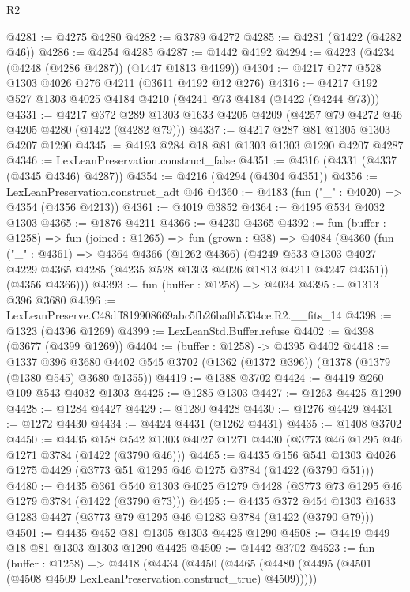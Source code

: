 \begin{lexlean}{R2}
\begin{coremodule}
@4281 := @4275 @4280
@4282 := @3789 @4272
@4285 := @4281 (@1422 (@4282 @46))
@4286 := @4254 @4285
@4287 := @1442 @4192
@4294 := @4223 (@4234 (@4248 (@4286 @4287)) (@1447 @1813 @4199))
@4304 := @4217 @277 @528 @1303 @4026 @276 @4211 (@3611 @4192 @12 @276)
@4316 := @4217 @192 @527 @1303 @4025 @4184 @4210 (@4241 @73 @4184 (@1422 (@4244 @73)))
@4331 := @4217
    @372
    @289
    @1303
    @1633
    @4205
    @4209
    (@4257 @79 @4272 @46 @4205 @4280 (@1422 (@4282 @79)))
@4337 := @4217 @287 @81 @1305 @1303 @4207 @1290
@4345 := @4193 @284 @18 @81 @1303 @1303 @1290 @4207 @4287
@4346 := LexLeanPreservation.construct_false
@4351 := @4316 (@4331 (@4337 (@4345 @4346) @4287))
@4354 := @4216 (@4294 (@4304 @4351))
@4356 := LexLeanPreservation.construct_adt @46
@4360 := @4183 (fun ("_" : @4020) => @4354 (@4356 @4213))
@4361 := @4019 @3852
@4364 := @4195 @534 @4032 @1303
@4365 := @1876 @4211
@4366 := @4230 @4365
@4392 := fun (buffer : @1258) =>
  fun (joined : @1265) =>
  fun (grown : @38) =>
  @4084
    (@4360
      (fun ("_" : @4361) =>
      @4364
        @4366
        (@1262 @4366)
        (@4249 @533 @1303 @4027 @4229 @4365 @4285 (@4235 @528 @1303 @4026 @1813 @4211 @4247 @4351))
        (@4356 @4366)))
@4393 := fun (buffer : @1258) => @4034
@4395 := @1313 @396 @3680
@4396 := LexLeanPreserve.C48dff819908669abc5fb26ba0b5334ce.R2.__fits_14
@4398 := @1323 (@4396 @1269)
@4399 := LexLeanStd.Buffer.refuse
@4402 := @4398 (@3677 (@4399 @1269))
@4404 := (buffer : @1258) -> @4395 @4402
@4418 := @1337
    @396
    @3680
    @4402
    @545
    @3702
    (@1362 (@1372 @396))
    (@1378 (@1379 (@1380 @545) @3680 @1355))
@4419 := @1388 @3702
@4424 := @4419 @260 @109 @543 @4032 @1303
@4425 := @1285 @1303
@4427 := @1263 @4425 @1290
@4428 := @1284 @4427
@4429 := @1280 @4428
@4430 := @1276 @4429
@4431 := @1272 @4430
@4434 := @4424 @4431 (@1262 @4431)
@4435 := @1408 @3702
@4450 := @4435
    @158
    @542
    @1303
    @4027
    @1271
    @4430
    (@3773 @46 @1295 @46 @1271 @3784 (@1422 (@3790 @46)))
@4465 := @4435
    @156
    @541
    @1303
    @4026
    @1275
    @4429
    (@3773 @51 @1295 @46 @1275 @3784 (@1422 (@3790 @51)))
@4480 := @4435
    @361
    @540
    @1303
    @4025
    @1279
    @4428
    (@3773 @73 @1295 @46 @1279 @3784 (@1422 (@3790 @73)))
@4495 := @4435
    @372
    @454
    @1303
    @1633
    @1283
    @4427
    (@3773 @79 @1295 @46 @1283 @3784 (@1422 (@3790 @79)))
@4501 := @4435 @452 @81 @1305 @1303 @4425 @1290
@4508 := @4419 @449 @18 @81 @1303 @1303 @1290 @4425
@4509 := @1442 @3702
@4523 := fun (buffer : @1258) =>
  @4418
    (@4434
      (@4450 (@4465 (@4480 (@4495 (@4501 (@4508 @4509 LexLeanPreservation.construct_true) @4509)))))

\end{coremodule}
\end{lexlean}
